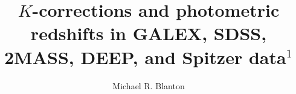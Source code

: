 \documentclass[10pt,preprint]{aastex}
\begin{document}
 
\title{$K$-corrections and photometric redshifts in GALEX, SDSS,
2MASS, DEEP, and Spitzer data$^1$}

\author{
Michael R. Blanton\altaffilmark{\ref{NYU}}
}
\end{document}
